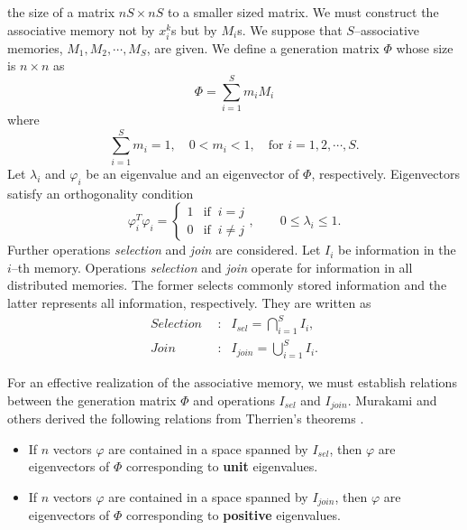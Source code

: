 the size of a matrix $nS \times nS $ to a smaller sized 
matrix.  We must construct the associative memory not 
by $x_i^k $s but by $M_i $s.  We suppose that 
$S$--associative memories, $M_1, M_2, \cdots, 
M_S$, are given.  We define a generation matrix $\Phi $ 
whose size is $n \times n $ as
$$ \Phi = \sum_{i=1}^S m_iM_i $$
where 
$$ \sum_{i=1}^S m_i = 1, \quad 0<m_i<1, \quad 
\mbox{for }i=1,2,\cdots,S . $$
Let $\lambda_i $ and $\varphi_i $ be an eigenvalue and 
an eigenvector of $\Phi $, respectively.  Eigenvectors 
satisfy an orthogonality condition 
$$ \varphi_i^T \varphi_i = \left\{ \begin{array}{ll}
1 & \mbox{if } \ i=j \\ 0 & \mbox{if } \ i \neq j 
\end{array} \right. , \qquad 0 \leq \lambda_i \leq 1 .$$
Further operations {\it selection } and {\it join } are 
considered.  Let $I_i $ be information in the $i$--th 
memory.  Operations {\it selection} and {\it join} 
operate for information in all distributed memories.  
The former selects commonly stored information and the 
latter represents all information, respectively.  They 
are written as 
\begin{eqnarray*}
Selection \ \ &:& I_{sel} = \bigcap_{i=1}^S I_i  ,\\
Join &:& I_{join} = \bigcup_{i=1}^S I_i .  
\end{eqnarray*}

For an effective realization of the associative memory, 
we must establish relations between the generation 
matrix $\Phi $ and operations $I_{sel} $ and 
$I_{join} $.  
Murakami and others \cite{Mu93} derived 
the following relations from Therrien's theorems \cite{Th75}.  
\begin{itemize}
\item If $n$ vectors $\varphi $ are contained in a 
space spanned by $I_{sel} $, then $\varphi $ are 
eigenvectors of $\Phi$ corresponding to {\bf unit} 
eigenvalues.
\item If $n$ vectors $\varphi $ are contained in a 
space spanned by $I_{join} $, then $\varphi $ are 
eigenvectors of $\Phi $ corresponding to {\bf positive} 
eigenvalues.
\end{itemize}


